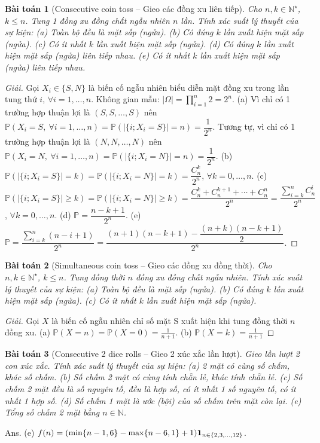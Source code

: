 \documentclass{article}
\newtheorem{baitoan}{Bài toán}
\begin{document}
\begin{baitoan}[Consecutive coin toss -- Gieo các đồng xu liên tiếp]
	Cho $n,k\in\mathbb{N}^\star$, $k\le n$. Tung 1 đồng xu đồng chất ngẫu nhiên $n$ lần. Tính xác suất lý thuyết của sự kiện: (a) Toàn bộ đều là mặt sấp (ngửa). (b) Có đúng $k$ lần xuất hiện mặt sấp (ngửa). (c) Có ít nhất $k$ lần xuất hiện mặt sấp (ngửa). (d) Có đúng $k$ lần xuất hiện mặt sấp (ngửa) liên tiếp nhau. (e) Có ít nhất $k$ lần xuất hiện mặt sấp (ngửa) liên tiếp nhau.
\end{baitoan}

\begin{proof}[Giải]
	Gọi $X_i\in\{S,N\}$ là biến cố ngẫu nhiên biểu diễn mặt đồng xu trong lần tung thứ $i$, $\forall i = 1,\ldots,n$. Không gian mẫu: $|\Omega| = \prod_{i=1}^n 2 = 2^n$. (a) Vì chỉ có 1 trường hợp thuận lợi là $(S,S,\ldots,S)$ nên $\mathbb{P}(X_i = S,\ \forall i = 1,\ldots,n) = \mathbb{P}(|\{i;X_i = S\}| = n) = \dfrac{1}{2^n}$. Tương tự, vì chỉ có 1 trường hợp thuận lợi là $(N,N,\ldots,N)$ nên $\mathbb{P}(X_i = N,\ \forall i = 1,\ldots,n) = \mathbb{P}(|\{i;X_i = N\}| = n) = \dfrac{1}{2^n}$. (b) $\mathbb{P}(|\{i;X_i = S\}| = k) = \mathbb{P}(|\{i;X_i = N\}| = k) = \dfrac{C_n^k}{2^n}$, $\forall k = 0,\ldots,n$. (c) $\mathbb{P}(|\{i;X_i = S\}|\ge k) = \mathbb{P}(|\{i;X_i = N\}|\ge k) = \dfrac{C_n^k + C_n^{k+1} + \cdots + C_n^n}{2^n} = \dfrac{\sum_{i=k}^n C_n^i}{2^n}$, $\forall k = 0,\ldots,n$. (d) $\mathbb{P} = \dfrac{n - k + 1}{2^n}$. (e) $\mathbb{P} = \dfrac{\sum_{i=k}^n (n - i + 1)}{2^n} = \dfrac{(n + 1)(n - k + 1) - \dfrac{(n + k)(n - k + 1)}{2}}{2^n}$.
	
\end{proof}

\begin{baitoan}[Simultaneous coin toss -- Gieo các đồng xu đồng thời]
	Cho $n,k\in\mathbb{N}^\star$, $k\le n$. Tung đồng thời $n$ đồng xu đồng chất ngẫu nhiên. Tính xác suất lý thuyết của sự kiện: (a) Toàn bộ đều là mặt sấp (ngửa). (b) Có đúng $k$ lần xuất hiện mặt sấp (ngửa). (c) Có ít nhất $k$ lần xuất hiện mặt sấp (ngửa).
\end{baitoan}

\begin{proof}[Giải]
	Gọi $X$ là biến cố ngẫu nhiên chỉ số mặt S xuất hiện khi tung đồng thời $n$ đồng xu. (a) $\mathbb{P}(X = n) = \mathbb{P}(X = 0) = \frac{1}{n + 1}$. (b) $\mathbb{P}(X = k) = \frac{1}{n + 1}$
\end{proof}

\begin{baitoan}[Consecutive 2 dice rolls -- Gieo 2 xúc xắc lần lượt]
	Gieo lần lượt 2 con xúc xắc. Tính xác suất lý thuyết của sự kiện: (a) 2 mặt có cùng số chấm, khác số chấm. (b) Số chấm 2 mặt có cùng tính chẵn lẻ, khác tính chẵn lẻ. (c) Số chấm 2 mặt đều là số nguyên tố, đều là hợp số, có ít nhất 1 số nguyên tố, có ít nhất 1 hợp số. (d) Số chấm 1 mặt là ước (bội) của số chấm trên mặt còn lại. (e) Tổng số chấm 2 mặt bằng $n\in\mathbb{N}$.
\end{baitoan}
{\sf Ans.} (e) $f(n) = (\min\{n - 1, 6\} - \max\{n - 6,1\} + 1){\bf1}_{n\in\{2,3,\ldots,12\}}$.
\end{document}
